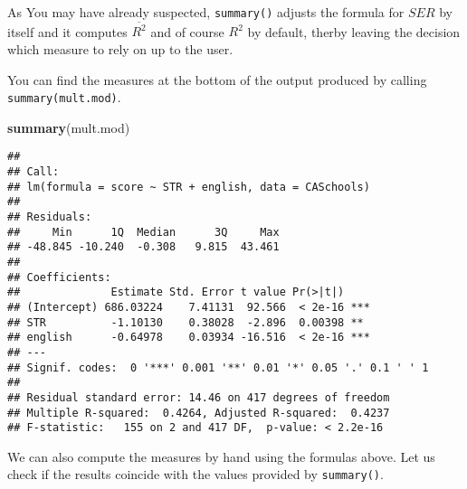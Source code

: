 \documentclass[]{book}
\newenvironment{Shaded}{\begin{snugshade}}{\end{snugshade}}
\newcommand{\KeywordTok}[1]{\textcolor[rgb]{0.13,0.29,0.53}{\textbf{#1}}}
\newcommand{\NormalTok}[1]{#1}
\theoremstyle{definition}
\theoremstyle{definition}
\theoremstyle{definition}
\theoremstyle{remark}
\begin{document}
As You may have already suspected, \texttt{summary()} adjusts the
formula for \(SER\) by itself and it computes \(\overline{R^2}\) and of
course \(R^2\) by default, therby leaving the decision which measure to
rely on up to the user.

You can find the measures at the bottom of the output produced by
calling \texttt{summary(mult.mod)}.

\begin{Shaded}
\begin{Highlighting}[]
\KeywordTok{summary}\NormalTok{(mult.mod)}
\end{Highlighting}
\end{Shaded}

\begin{verbatim}
## 
## Call:
## lm(formula = score ~ STR + english, data = CASchools)
## 
## Residuals:
##     Min      1Q  Median      3Q     Max 
## -48.845 -10.240  -0.308   9.815  43.461 
## 
## Coefficients:
##              Estimate Std. Error t value Pr(>|t|)    
## (Intercept) 686.03224    7.41131  92.566  < 2e-16 ***
## STR          -1.10130    0.38028  -2.896  0.00398 ** 
## english      -0.64978    0.03934 -16.516  < 2e-16 ***
## ---
## Signif. codes:  0 '***' 0.001 '**' 0.01 '*' 0.05 '.' 0.1 ' ' 1
## 
## Residual standard error: 14.46 on 417 degrees of freedom
## Multiple R-squared:  0.4264, Adjusted R-squared:  0.4237 
## F-statistic:   155 on 2 and 417 DF,  p-value: < 2.2e-16
\end{verbatim}

We can also compute the measures by hand using the formulas above. Let
us check if the results coincide with the values provided by
\texttt{summary()}.
\end{document}
